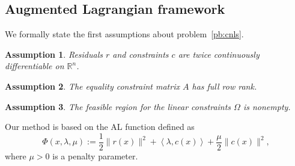 \documentclass{article}
\numberwithin{equation}{section}
\newcommand{\RR}{{\mathbb{R}}} %
\newcommand{\inner}[2]{\left\langle {#1} , {#2} \right\rangle} %
\theoremstyle{plain}
\newtheorem{assumption}{Assumption}
\begin{document}
	\subsection{Augmented Lagrangian framework}\label{subsec:al_framework}

We formally state the first assumptions about problem~\eqref{pb:cnls}.
\begin{assumption}\label{assumption:functions_C2}
	Residuals $r$ and constraints $c$ are twice continuously differentiable on $\RR^n$.
\end{assumption}
\begin{assumption}\label{assumption:full_rank_A}
	The equality constraint matrix $A$ has full row rank.
\end{assumption}
\begin{assumption}\label{assumption:feasible_linear_cons}
	The feasible region for the linear constraints $\Omega$ is nonempty.
\end{assumption}

Our method is based on the AL function defined as
\begin{equation}\label{eq:al}
	\Phi(x,\lambda,\mu) := \dfrac{1}{2}\|r(x)\|^2 + \inner{\lambda}{c(x)} + \dfrac{\mu}{2} \|c(x)\|^2,
\end{equation}
where $\mu > 0$ is a penalty parameter.
\end{document}
